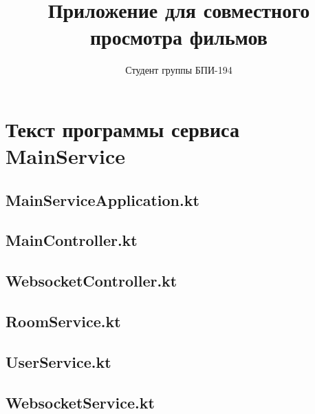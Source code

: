 \documentclass{../includes/TechDoc}
\title{Приложение для совместного просмотра фильмов}
\author{Студент группы БПИ-194}{В. А. Анненков}
\begin{document}
    \maketitle

    \tableofcontents


    \section{Текст программы сервиса MainService}

    \subsection{MainServiceApplication.kt}
    

    \subsection{MainController.kt}
    

    \subsection{WebsocketController.kt}
    

    \subsection{RoomService.kt}
    

    \subsection{UserService.kt}
    

    \subsection{WebsocketService.kt}
    
\end{document}
